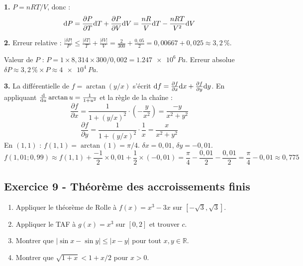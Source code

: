 \documentclass[12pt,a4paper]{article}
\begin{document}
\begin{boitecorrige}
\textbf{1.} $P = nRT/V$, donc :
\[
\mathrm{d} P = \frac{\partial P}{\partial T}\mathrm{d} T + \frac{\partial P}{\partial V}\mathrm{d} V = \frac{nR}{V}\mathrm{d} T - \frac{nRT}{V^2}\mathrm{d} V
\]

\textbf{2.} Erreur relative : $\frac{|\delta P|}{P} \leq \frac{|\delta T|}{T} + \frac{|\delta V|}{V} = \frac{2}{300}+\frac{0{,}05}{2} = 0{,}00667+0{,}025 \approx 3{,}2\,\%$.

Valeur de $P$ : $P = 1\times8{,}314\times300/0{,}002 = \qty{1.247e6}{Pa}$. Erreur absolue $\delta P \approx 3{,}2\,\%\times P \approx \qty{4e4}{Pa}$.

\textbf{3.} La différentielle de $f = \arctan(y/x)$ s'écrit $\mathrm{d} f = \frac{\partial f}{\partial x}\mathrm{d} x + \frac{\partial f}{\partial y}\mathrm{d} y$. En appliquant $\frac{\mathrm{d}}{\mathrm{d} u}\arctan u = \frac{1}{1+u^2}$ et la règle de la chaîne :
\[
\frac{\partial f}{\partial x} = \frac{1}{1+(y/x)^2}\cdot\left(-\frac{y}{x^2}\right) = \frac{-y}{x^2+y^2}
\]
\[
\frac{\partial f}{\partial y} = \frac{1}{1+(y/x)^2}\cdot\frac{1}{x} = \frac{x}{x^2+y^2}
\]
En $(1,1)$ : $f(1,1)=\arctan(1)=\pi/4$. $\delta x = 0{,}01$, $\delta y = -0{,}01$.
\[
f(1{,}01;0{,}99) \approx f(1,1) + \frac{-1}{2}\times0{,}01+\frac{1}{2}\times(-0{,}01) = \frac{\pi}{4}-\frac{0{,}01}{2}-\frac{0{,}01}{2} = \frac{\pi}{4}-0{,}01 \approx 0{,}775
\]
\end{boitecorrige}

\subsection*{Exercice 9 - Théorème des accroissements finis \niveau{\moyen}}

\begin{boiteexercice}
\begin{enumerate}
  \item Appliquer le théorème de Rolle à $f(x) = x^3 - 3x$ sur $[-\sqrt{3}, \sqrt{3}]$.
  \item Appliquer le TAF à $g(x) = x^3$ sur $[0, 2]$ et trouver $c$.
  \item Montrer que $|\sin x - \sin y| \leq |x-y|$ pour tout $x, y \in \mathbb{R}$.
  \item Montrer que $\sqrt{1+x} < 1+x/2$ pour $x > 0$.
\end{enumerate}
\end{boiteexercice}
\end{document}
